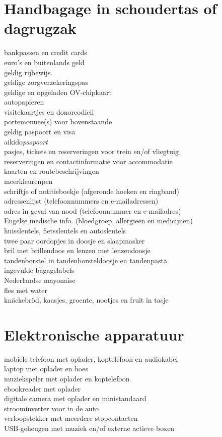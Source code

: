 \documentclass[9pt,twocolumn]{memoir}
\begin{document}
\section*{Handbagage in schoudertas of dagrugzak}%
bankpassen en credit cards\\%
euro's en buitenlands geld\\%
geldig rijbewijs\\%
geldige zorgverzekeringspas\\%
geldige en opgeladen OV-chipkaart\\%
autopapieren\\%
visitekaartjes en donorcodicil\\%
portemonnee(s) voor bovenstaande\\%
geldig paspoort en visa\\%
aikido{\itshape{paspoort}}\\%
pasjes, tickets en reserveringen voor trein en/of vliegtuig\\%
reserveringen en contactinformatie voor accommodatie\\%
kaarten en routebeschrijvingen\\%
meerkleurenpen\\%
schriftje of notitieboekje (afgeronde hoeken en ringband)\\%
adressenlijst (telefoonnummers en e-mailadressen)\\%
adres in geval van nood (telefoonnummer en e-mailadres)\\%
Engelse medische info. (bloedgroep, allergieën en medicijnen)\\%
huissleutels, fietssleutels en autosleutels\\%
twee paar oordopjes in doosje en slaapmasker\\%
bril met brillendoos en lenzen met lenzendoosje\\%
tandenborstel in tandenborsteldoosje en tandenpasta\\%
ingevulde bagagelabels\\%
Nederlandse mayonaise\\%
fles met water\\%
knäckebröd, kaasjes, groente, nootjes en fruit in tasje%

\section*{Elektronische apparatuur}%
mobiele telefoon met oplader, koptelefoon en audiokabel\\%
laptop met oplader en hoes\\%
muziekspeler met oplader en koptelefoon\\%
ebookreader met oplader\\%
digitale camera met oplader en ministandaard\\%
stroominverter voor in de auto\\%
verloopstekker met meerdere stopcontacten\\%
USB-geheugen met muziek en/of externe actieve boxen%
\end{document}
